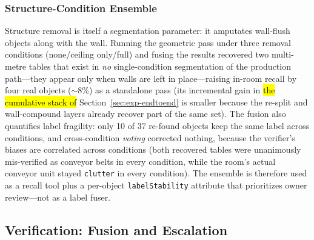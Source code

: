 \documentclass[electronics,article,accept,pdftex,moreauthors]{Definitions/mdpi}
\begin{document}
\subsubsection{Structure-Condition Ensemble}
Structure removal is itself a segmentation parameter: it amputates
wall-flush objects along with the wall. Running the geometric pass
under three removal conditions (none/ceiling only/full) and fusing
the results recovered two multi-metre tables that exist in \emph{no}
single-condition segmentation of the production path---they appear
only when walls are left in place---raising in-room recall by four
real objects ($\sim$8\%) as a standalone pass (its incremental gain in
\hl{the cumulative stack of} Section~\ref{sec:exp-endtoend} %
is smaller because the
re-split and wall-compound layers already recover part of the same set). The fusion also quantifies label fragility:
only 10 of 37 re-found objects keep the same label across conditions,
and cross-condition \emph{voting} corrected nothing, because the
verifier's biases are correlated across conditions (both recovered
tables were unanimously mis-verified as conveyor belts in every
condition, while the room's actual conveyor unit stayed
\texttt{clutter} in every condition). The ensemble is therefore used as
a recall tool plus a per-object \texttt{labelStability} attribute that
prioritizes owner review---not as a label fuser.

\subsection{Verification: Fusion and Escalation}
\label{sec:exp-verify}
\end{document}
